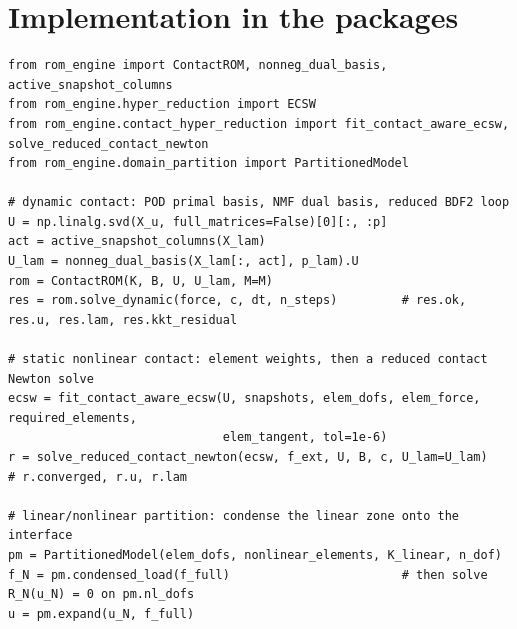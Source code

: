 \section{Implementation in the packages}\label{sec:hy-impl}

\begin{lstlisting}[caption={A reduced contact model in dynamics, a contact-aware ECSW with a reduced contact Newton solve, and a partition (names as in the benchmarks of this chapter).},label={lst:hy-run}]
from rom_engine import ContactROM, nonneg_dual_basis, active_snapshot_columns
from rom_engine.hyper_reduction import ECSW
from rom_engine.contact_hyper_reduction import fit_contact_aware_ecsw, solve_reduced_contact_newton
from rom_engine.domain_partition import PartitionedModel

# dynamic contact: POD primal basis, NMF dual basis, reduced BDF2 loop
U = np.linalg.svd(X_u, full_matrices=False)[0][:, :p]
act = active_snapshot_columns(X_lam)
U_lam = nonneg_dual_basis(X_lam[:, act], p_lam).U
rom = ContactROM(K, B, U, U_lam, M=M)
res = rom.solve_dynamic(force, c, dt, n_steps)         # res.ok, res.u, res.lam, res.kkt_residual

# static nonlinear contact: element weights, then a reduced contact Newton solve
ecsw = fit_contact_aware_ecsw(U, snapshots, elem_dofs, elem_force, required_elements,
                              elem_tangent, tol=1e-6)
r = solve_reduced_contact_newton(ecsw, f_ext, U, B, c, U_lam=U_lam)   # r.converged, r.u, r.lam

# linear/nonlinear partition: condense the linear zone onto the interface
pm = PartitionedModel(elem_dofs, nonlinear_elements, K_linear, n_dof)
f_N = pm.condensed_load(f_full)                        # then solve R_N(u_N) = 0 on pm.nl_dofs
u = pm.expand(u_N, f_full)
\end{lstlisting}

